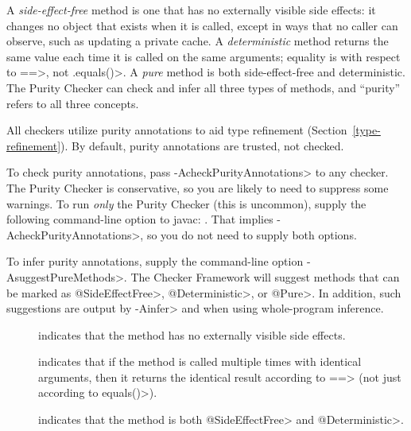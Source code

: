 
A \emph{side-effect-free} method is one that has no externally visible side
effects:  it changes no object that exists when it is called, except in ways
that no caller can observe, such as updating a private cache.
A \emph{deterministic} method returns the same value each time it is called
on the same arguments; equality is with respect to \<==>, not \<.equals()>.
A \emph{pure} method is both side-effect-free and deterministic.
The Purity Checker can check and infer all three types of methods,
and ``purity'' refers to all three concepts.

All checkers utilize purity annotations to aid type refinement
(Section~\ref{type-refinement}).  By default, purity annotations are
trusted, not checked.

To check purity annotations, pass \<-AcheckPurityAnnotations> to any
checker.
The Purity Checker is conservative, so you are likely to need to suppress
some warnings.
To run \emph{only} the Purity Checker (this is uncommon),
supply the following command-line option to javac:
.
That implies \<-AcheckPurityAnnotations>, so you do not need to supply
both options.

To infer purity annotations,
supply the command-line option \<-AsuggestPureMethods>.
The Checker Framework will suggest methods that can be marked as
\<@SideEffectFree>, \<@Deterministic>, or \<@Pure>.
In addition, such suggestions are output by \<-Ainfer> and when using
whole-program inference.



\begin{description}

\item[]
  indicates that the method has no externally visible side effects.

\item[]
  indicates that if the method is called multiple times with identical
  arguments, then it returns the identical result according to \<==>
  (not just according to \<equals()>).

\item[]
  indicates that the method is both \<@SideEffectFree> and \<@Deterministic>.

\end{description}


